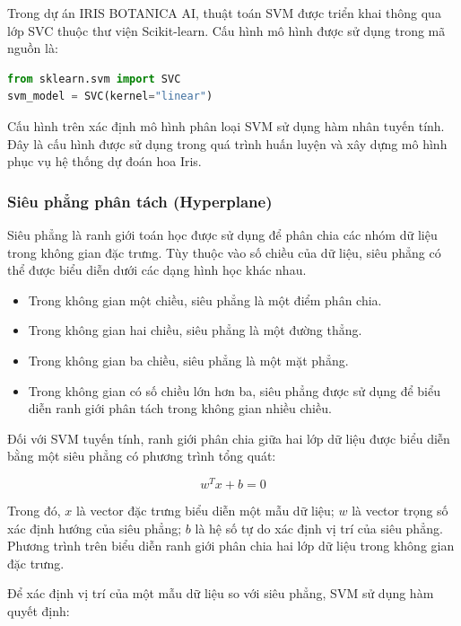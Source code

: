 \documentclass[14pt]{extarticle}
\begin{document}
\noindent Trong dự án IRIS BOTANICA AI, thuật toán SVM được triển khai thông qua lớp SVC thuộc thư viện Scikit-learn. Cấu hình mô hình được sử dụng trong mã nguồn là:
\begin{lstlisting}[language=Python]
from sklearn.svm import SVC
svm_model = SVC(kernel="linear")
\end{lstlisting}

\noindent Cấu hình trên xác định mô hình phân loại SVM sử dụng hàm nhân tuyến tính. Đây là cấu hình được sử dụng trong quá trình huấn luyện và xây dựng mô hình phục vụ hệ thống dự đoán hoa Iris.\\

	
	\subsubsection{Siêu phẳng phân tách (Hyperplane) }
	\noindent Siêu phẳng là ranh giới toán học được sử dụng để phân chia các nhóm dữ liệu trong không gian đặc trưng. Tùy thuộc vào số chiều của dữ liệu, siêu phẳng có thể được biểu diễn dưới các dạng hình học khác nhau.\\
	
\begin{itemize}
	\item Trong không gian một chiều, siêu phẳng là một điểm phân chia.
	
	\item Trong không gian hai chiều, siêu phẳng là một đường thẳng.
	
	\item Trong không gian ba chiều, siêu phẳng là một mặt phẳng.
	
	\item Trong không gian có số chiều lớn hơn ba, siêu phẳng được sử dụng để biểu diễn ranh giới phân tách trong không gian nhiều chiều.
\end{itemize}
\noindent Đối với SVM tuyến tính, ranh giới phân chia giữa hai lớp dữ liệu được biểu diễn bằng một siêu phẳng có phương trình tổng quát:

\[
w^Tx+b=0
\]

\noindent Trong đó, $x$ là vector đặc trưng biểu diễn một mẫu dữ liệu; $w$ là vector trọng số xác định hướng của siêu phẳng; $b$ là hệ số tự do xác định vị trí của siêu phẳng. Phương trình trên biểu diễn ranh giới phân chia hai lớp dữ liệu trong không gian đặc trưng.

\noindent Để xác định vị trí của một mẫu dữ liệu so với siêu phẳng, SVM sử dụng hàm quyết định:
\end{document}
